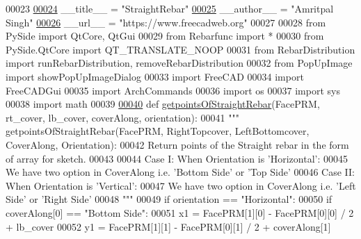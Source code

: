 \begin{DoxyCode}
00023 
\hypertarget{StraightRebar_8py_source.tex_l00024}{}\hyperlink{namespaceStraightRebar_ab1d45eb17133c23d9d6a3e2a6f2abb8a}{00024} \_\_title\_\_ = \textcolor{stringliteral}{"StraightRebar"}
\hypertarget{StraightRebar_8py_source.tex_l00025}{}\hyperlink{namespaceStraightRebar_ad355d40e3bea5e86c24b6fe813264413}{00025} \_\_author\_\_ = \textcolor{stringliteral}{"Amritpal Singh"}
\hypertarget{StraightRebar_8py_source.tex_l00026}{}\hyperlink{namespaceStraightRebar_aebf23f453d8fabed3a611d14f5e7f057}{00026} \_\_url\_\_ = \textcolor{stringliteral}{"https://www.freecadweb.org"}
00027 
00028 \textcolor{keyword}{from} PySide \textcolor{keyword}{import} QtCore, QtGui
00029 \textcolor{keyword}{from} Rebarfunc \textcolor{keyword}{import} *
00030 \textcolor{keyword}{from} PySide.QtCore \textcolor{keyword}{import} QT\_TRANSLATE\_NOOP
00031 \textcolor{keyword}{from} RebarDistribution \textcolor{keyword}{import} runRebarDistribution, removeRebarDistribution
00032 \textcolor{keyword}{from} PopUpImage \textcolor{keyword}{import} showPopUpImageDialog
00033 \textcolor{keyword}{import} FreeCAD
00034 \textcolor{keyword}{import} FreeCADGui
00035 \textcolor{keyword}{import} ArchCommands
00036 \textcolor{keyword}{import} os
00037 \textcolor{keyword}{import} sys
00038 \textcolor{keyword}{import} math
00039 
\hypertarget{StraightRebar_8py_source.tex_l00040}{}\hyperlink{namespaceStraightRebar_a1873c6f7f59b355a64fdd966ad75f778}{00040} \textcolor{keyword}{def }\hyperlink{namespaceStraightRebar_a1873c6f7f59b355a64fdd966ad75f778}{getpointsOfStraightRebar}(FacePRM, rt\_cover, lb\_cover, coverAlong, orientation):
00041     \textcolor{stringliteral}{""" getpointsOfStraightRebar(FacePRM, RightTopcover, LeftBottomcover, CoverAlong, Orientation):}
00042 \textcolor{stringliteral}{    Return points of the Straight rebar in the form of array for sketch.}
00043 \textcolor{stringliteral}{}
00044 \textcolor{stringliteral}{    Case I: When Orientation is 'Horizontal':}
00045 \textcolor{stringliteral}{        We have two option in CoverAlong i.e. 'Bottom Side' or 'Top Side'}
00046 \textcolor{stringliteral}{    Case II: When Orientation is 'Vertical':}
00047 \textcolor{stringliteral}{        We have two option in CoverAlong i.e. 'Left Side' or 'Right Side'}
00048 \textcolor{stringliteral}{    """}
00049     \textcolor{keywordflow}{if} orientation == \textcolor{stringliteral}{"Horizontal"}:
00050         \textcolor{keywordflow}{if} coverAlong[0] == \textcolor{stringliteral}{"Bottom Side"}:
00051             x1 = FacePRM[1][0] - FacePRM[0][0] / 2 + lb\_cover
00052             y1 = FacePRM[1][1] - FacePRM[0][1] / 2 + coverAlong[1]

\end{DoxyCode}
